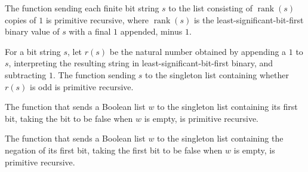 \begin{theorem}
\label{Complexity.ntc_primrec_emit}
\leanok
{}
The function sending each finite bit string $s$ to the list consisting of
$\operatorname{rank}(s)$ copies of $1$ is primitive recursive, where
$\operatorname{rank}(s)$ is the least-significant-bit-first binary value of $s$ with a
final $1$ appended, minus $1$.
\end{theorem}

\begin{theorem}
\label{Complexity.ntc_primrec_parity}
\leanok
{}
For a bit string $s$, let $r(s)$ be the natural number obtained by appending a $1$ to
$s$, interpreting the resulting string in least-significant-bit-first binary, and
subtracting $1$. The function sending $s$ to the singleton list containing whether
$r(s)$ is odd is primitive recursive.
\end{theorem}

\begin{theorem}
\label{Complexity.ntc_primrec_head}
\leanok
{}
The function that sends a Boolean list $w$ to the singleton list containing its first
bit, taking the bit to be false when $w$ is empty, is primitive recursive.
\end{theorem}

\begin{theorem}
\label{Complexity.ntc_primrec_nhead}
\leanok
{}
The function that sends a Boolean list $w$ to the singleton list containing the negation
of its first bit, taking the first bit to be false when $w$ is empty, is primitive
recursive.
\end{theorem}

